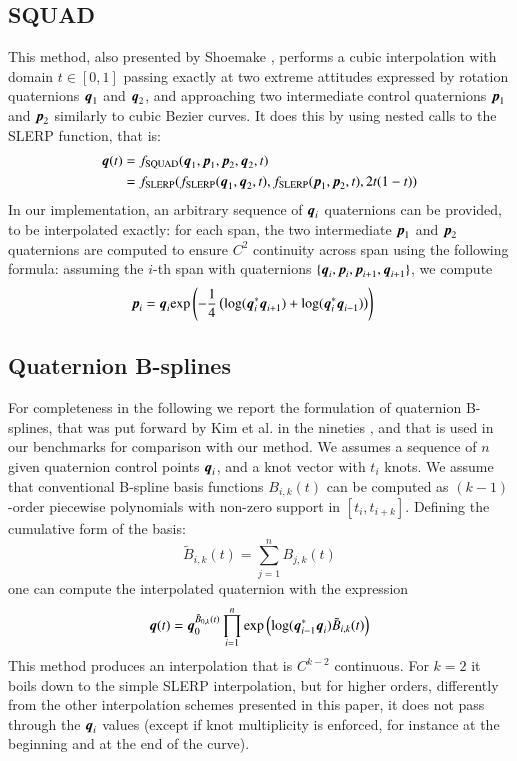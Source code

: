 \subsection{SQUAD}
This method, also presented by Shoemake \cite{Shoemake1987QuaternionCA}, performs a cubic interpolation with domain $t \in [0,1]$ passing exactly at two extreme attitudes expressed by rotation quaternions ${\boldsymbol{q}}_1$ and ${\boldsymbol{q}}_2$, and approaching two intermediate control quaternions ${\boldsymbol{p}}_1$ and ${\boldsymbol{p}}_2$ similarly to cubic Bezier curves. It does this by using nested calls to the SLERP function, that is:
\begin{align}
\label{eq:at:quatrotSQUAD}
 {\boldsymbol{q}}(t) &=  f_{\text{SQUAD}}({\boldsymbol{q}}_1,{\boldsymbol{p}}_1,{\boldsymbol{p}}_2,{\boldsymbol{q}}_2,t) \nonumber \\
  &= f_{\text{SLERP}}( f_{\text{SLERP}}({\boldsymbol{q}}_1,{\boldsymbol{q}}_2 ,t),  f_{\text{SLERP}}({\boldsymbol{p}}_1,{\boldsymbol{p}}_2 ,t), 2 t (1-t) )
\end{align}
In our implementation, an arbitrary sequence of ${\boldsymbol{q}}_i$ quaternions can be provided, to be interpolated exactly: for each span, the two intermediate ${\boldsymbol{p}}_1$ and ${\boldsymbol{p}}_2$ quaternions are computed to ensure $C^2$ continuity across span using the following formula: assuming the $i$-th span with quaternions 
$\{ {\boldsymbol{q}}_i, {\boldsymbol{p}}_i, {\boldsymbol{p}}_{i+1}, {\boldsymbol{q}}_{i+1}\}$, we compute 
\begin{align}
\label{eq:at:quatrotSQUADinner}
 {\boldsymbol{p}}_i &= {\boldsymbol{q}}_i \mathrm{exp} \left( - \frac{1}{4} \left( \mathrm{log}({\boldsymbol{q}}_i^* {\boldsymbol{q}}_{i+1}) + \mathrm{log}({\boldsymbol{q}}_i^* {\boldsymbol{q}}_{i-1})  \right)  \right)  
\end{align}

\subsection{Quaternion B-splines}
For completeness in the following we report the formulation of quaternion B-splines, that was put forward by Kim et al. in the nineties \cite{kim1995ac}, and that is used in our benchmarks for comparison with our method. 
We assumes a sequence of $n$ given quaternion control points ${\boldsymbol{q}}_i$, and a knot vector with $t_i$ knots. We assume that conventional B-spline basis functions $B_{i,k}(t)$ can be computed as $(k-1)$-order piecewise polynomials with non-zero support in $[t_i,t_{i+k}]$. Defining the cumulative form of the basis:
\begin{equation}
    \tilde{B}_{i,k}(t) = \sum_{j=1}^{n} B_{j,k}(t)  
\end{equation}
one can compute the interpolated quaternion with the expression
\begin{equation}
    {\boldsymbol{q}}(t) = {\boldsymbol{q}}_0^{\tilde{B}_{0,k}(t)} \prod_{i=1}^{n} \exp \left( \log({\boldsymbol{q}}_{i-1}^* {\boldsymbol{q}}_i) \tilde{B}_{i,k}(t) \right)
\end{equation}
This method produces an interpolation that is $C^{k-2}$ continuous. For $k=2$ it boils down to the simple SLERP interpolation, but for higher orders, differently from the other interpolation schemes presented in this paper, it does not pass through the ${\boldsymbol{q}}_i$ values (except if knot multiplicity is enforced, for instance at the beginning and at the end of the curve).

